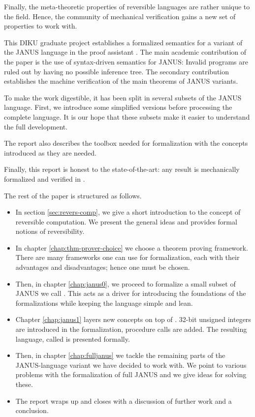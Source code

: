 Finally, the meta-theoretic properties of reversible languages are
rather unique to the field. Hence, the community of mechanical
verification gains a new set of properties to work with.

This DIKU graduate project establishes a formalized semantics for
a variant of the JANUS language in the proof assistant \coq{}. The
main academic contribution of the paper is the use of syntax-driven
semantics for JANUS: Invalid programs are ruled out by having no possible
inference tree. The secondary contribution establishes the machine
verification of the main theorems of JANUS variants.

To make the work digestible, it has been split in several subsets of
the JANUS language. First, we introduce some simplified versions
before processing the complete language. It is our hope that these
subsets make it easier to understand the full development.

The report also describes the toolbox needed for formalization with
the concepts introduced as they are needed.

Finally, this report is honest to the state-of-the-art: any result is
mechanically formalized and verified in \coq{}.

The rest of the paper is structured as follows.
\begin{itemize}
\item In section \ref{sec:revers-comp}, we give a short introduction
  to the concept of reversible computation. We present the general
  ideas and provides formal notions of reversibility.
\item In chapter \ref{chap:thm-prover-choice} we choose a theorem proving
  framework. There are many frameworks one can use for formalization,
  each with their advantages and disadvantages; hence one must be chosen.
\item Then, in chapter \ref{chap:janus0}, we proceed to formalize a
  small subset of JANUS we call \janusz{}. This acts as a driver for
  introducing the foundations of the formalizations while keeping the
  language simple and lean.
\item Chapter \ref{chap:janus1} layers new concepts on top of
  \janusz{}. 32-bit unsigned integers are introduced in the
  formalization, procedure calls are added. The resulting language,
  called \januso{} is presented formally.
\item Then, in chapter \ref{chap:fulljanus} we tackle the remaining
  parts of the JANUS-language variant we have decided to work with. We
  point to various problems with the formalization of full JANUS and
  we give ideas for solving these.
\item The report wraps up and closes with a discussion of further work
  and a conclusion.
\end{itemize}

